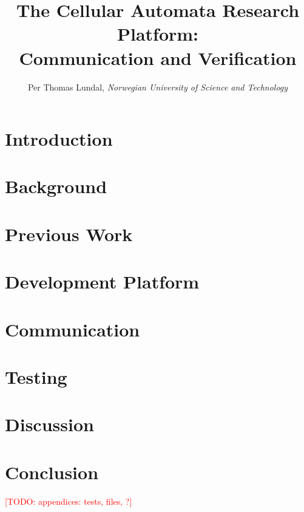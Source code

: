 \documentclass[a4paper]{IEEEtran}
\title{The Cellular Automata Research Platform: \\ Communication and Verification}
\author{Per Thomas Lundal, \emph{Norwegian University of Science and Technology}}
\newcommand\todo[1]{\textcolor{red}{[TODO: #1]}}
\begin{document}
\maketitle

\begin{abstract}

    

\end{abstract}

\section{Introduction}

    

\section{Background}

    

\section{Previous Work}

    

\section{Development Platform}

    

\section{Communication}

    

\section{Testing}

    

\section{Discussion}

    

\section{Conclusion}

    




\todo{appendices: tests, files, ?}
\end{document}
